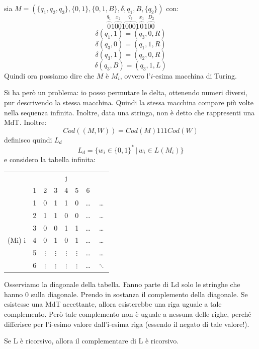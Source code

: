 \begin{example}
sia $M=(\{q_1,q_2,q_3\},\{0,1\},\{0,1,B\},\delta,q_1,B,\{q_2\})$ con:
$$\overbrace{0}^{q_1}1\overbrace{00}^{x_2}1\overbrace{000}^{q_3}1\overbrace{0}^{x_1}1\overbrace{00}^{D_2}$$
$$\delta(q_1,1)=(q_3,0,R)$$
$$\delta(q_3,0)=(q_1,1,R)$$
$$\delta(q_3,1)=(q_2,0,R)$$
$$\delta(q_3,B)=(q_3,1,L)$$
Quindi ora possiamo dire che $M$ è $M_i$, ovvero l'$i$-esima macchina di Turing.

Si ha però un problema: io posso permutare le delta, ottenendo numeri diversi, pur descrivendo la stessa
macchina. Quindi la stessa macchina compare più volte nella sequenza infinita. Inoltre, data una
stringa, non è detto che rappresenti una MdT. Inoltre:
$$Cod((M,W))=Cod(M)111Cod(W)$$
definisco quindi $L_d$
$$L_d=\{w_i\in\{0,1\}^*\,|\,w_i\in L(M_i)\}$$
e considero la tabella infinita:
\begin{center}
\begin{tabular}{c c|c c c c c c}
  &   &          &          & j        &          &                \\
  & 1 & 2        & 3        & 4        & 5        & 6              \\
  \hline
  & 1 & 0        & 1        & 1        & 0        & \ldots  & \ldots       \\
  & 2 & 1        & 1        & 0        & 0        & \ldots  & \ldots       \\
  & 3 & 0        & 0        & 1        & 1        & \ldots  & \ldots       \\
  (Mi) i & 4 & 0        & 1        & 0        & 1        & \ldots  & \ldots       \\
  & 5 & $\vdots$ & $\vdots$ & $\vdots$ & $\vdots$ & \ldots  & \ldots       \\
  & 6 & $\vdots$ & $\vdots$ & $\vdots$ & $\vdots$ & \ldots  & $\ddots$
\end{tabular}
\end{center}
Osserviamo la diagonale della tabella. Fanno parte di Ld solo le stringhe che hanno 0 sulla
diagonale. Prendo in sostanza il complemento della diagonale.
Se esistesse una MdT accettante, allora esisterebbe una riga uguale a tale complemento.
Però tale complemento non è uguale a nessuna delle righe, perché differisce per l'i-esimo valore
dall'i-esima riga (essendo il negato di tale valore!).
\end{example}
\begin{theorem}
Se L è ricorsivo, allora il complementare di L è ricorsivo.
\end{theorem}
